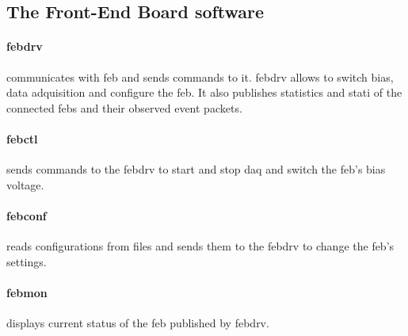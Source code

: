 \subsection{The Front-End Board software}

\paragraph{febdrv} communicates with \gls{feb} and sends commands to it.
febdrv allows to switch bias, data adquisition and configure the \gls{feb}.
It also publishes statistics and stati of the connected \glspl{feb} and their observed event packets.

\paragraph{febctl} sends commands to the febdrv to start and stop \gls{daq} and switch the \gls{feb}'s bias voltage.

\paragraph{febconf} reads configurations from files and sends them to the febdrv to change the \gls{feb}'s settings.

\paragraph{febmon} displays current status of the \gls{feb} published by febdrv.


